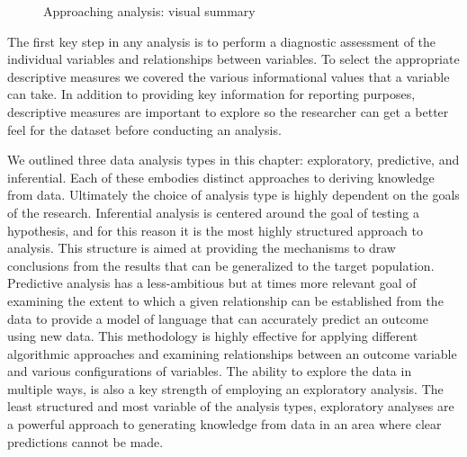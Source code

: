 \documentclass[
  letterpaper,
  DIV=11,
  numbers=noendperiod]{scrreprt}
\theoremstyle{definition}
\theoremstyle{remark}
\begin{document}
\begin{figure}[H]


\caption{\label{fig-approaching-analysis-vis-sum}Approaching analysis:
visual summary}

\end{figure}%

The first key step in any analysis is to perform a diagnostic assessment
of the individual variables and relationships between variables. To
select the appropriate descriptive measures we covered the various
informational values that a variable can take. In addition to providing
key information for reporting purposes, descriptive measures are
important to explore so the researcher can get a better feel for the
dataset before conducting an analysis.

We outlined three data analysis types in this chapter: exploratory,
predictive, and inferential. Each of these embodies distinct approaches
to deriving knowledge from data. Ultimately the choice of analysis type
is highly dependent on the goals of the research. Inferential analysis
is centered around the goal of testing a hypothesis, and for this reason
it is the most highly structured approach to analysis. This structure is
aimed at providing the mechanisms to draw conclusions from the results
that can be generalized to the target population. Predictive analysis
has a less-ambitious but at times more relevant goal of examining the
extent to which a given relationship can be established from the data to
provide a model of language that can accurately predict an outcome using
new data. This methodology is highly effective for applying different
algorithmic approaches and examining relationships between an outcome
variable and various configurations of variables. The ability to explore
the data in multiple ways, is also a key strength of employing an
exploratory analysis. The least structured and most variable of the
analysis types, exploratory analyses are a powerful approach to
generating knowledge from data in an area where clear predictions cannot
be made.
\end{document}
